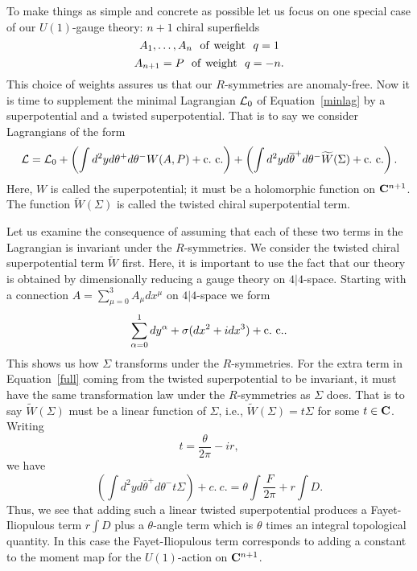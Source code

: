 To make things as simple and concrete as possible let us focus on one
special case of our $U(1)$-gauge theory: $n+1$ chiral superfields
$$A_1,\ldots, A_n\ \ {\rm of\ weight}\ \ q=1$$
$$A_{n+1}=P\ \ {\rm of\ weight}\ \ q=-n.$$
This choice of weights assures us that our $R$-symmetries are
anomaly-free.
Now it is time to supplement the minimal Lagrangian ${\cal L}_0$ of
Equation~\ref{minlag} by a
superpotential and a twisted superpotential.
That is to say we consider Lagrangians of the form
\begin{equation}\label{full}
{\cal L}={\cal L}_0+\left(\int d^2yd\theta^+d\theta^-
W(A,P)+{\rm c.\ c.}\right) + \left(\int
d^2yd\overline\theta^+d\theta^-\widetilde{W}(\Sigma)+{\rm c.\ c.}\right).
\end{equation}
Here, $W$ is called the superpotential; it must be   a holomorphic
function on ${\bf C}^{n+1}$. The function $\widetilde{W}(\Sigma)$ is called
the twisted chiral
superpotential term.

Let us examine the consequence of assuming that each
of these two
terms in the Lagrangian is invariant under the $R$-symmetries. We
consider the twisted chiral superpotential term $\widetilde{W}$ first.
Here, it is important to use the fact that our theory is obtained by
dimensionally reducing a gauge theory  on $4|4$-space.
Starting with a connection
$A=\sum_{\mu=0}^3A_\mu dx^\mu$ on $4|4$-space we form
$$\sum_{\alpha=0}^1dy^\alpha+\sigma(dx^2+idx^3)+{\rm c.\ c.}.$$
This shows us how $\Sigma$ transforms under the $R$-symmetries.
For the extra term in Equation~\ref{full} coming from the twisted
superpotential to be invariant, it must have the same transformation
law under the $R$-symmetries as $\Sigma$ does. That is to say
$\widetilde{W}(\Sigma)$ must be  a linear function of $\Sigma$, i.e.,
$\widetilde{W}(\Sigma)=t\Sigma$ for some $t\in {\bf C}$.
Writing
$$t=\frac{\theta}{2\pi}-ir,$$
we have
$$\left(\int d^2yd\overline\theta^+d\theta^-t\Sigma\right) +{c.\
c.}=\theta\int \frac{F}{2\pi}+r\int D.$$
Thus, we see that adding such a linear twisted superpotential produces
a Fayet-Iliopulous term $r\int D$ plus a $\theta$-angle term which is
$\theta$ times an integral topological quantity. In this case the
Fayet-Iliopulous term corresponds to adding a constant to the moment
map for the $U(1)$-action on ${\bf C}^{n+1}$.

